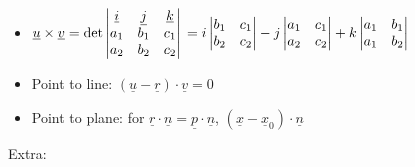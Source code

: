 \documentclass[10pt]{article}
\begin{document}
\begin{multicols}{2}
\begin{itemize}
    \item $\underline{u}\times\underline{v}=\det\begin{vmatrix}\underline{i} &\underline{j} &\underline{k}\\a_{1} &b_{1} &c_{1}\\a_{2} &b_{2} &c_{2}\end{vmatrix}\\=i\begin{vmatrix}b_{1}&c_{1}\\b_{2}&c_{2}\end{vmatrix}-j\begin{vmatrix}a_{1}&c_{1}\\a_{2}&c_{2}\end{vmatrix}+k\begin{vmatrix}a_{1}&b_{1}\\a_{1}&b_{2}\end{vmatrix}$
    \item Point to line: $(\underline{u}-\underline{r})\cdot\underline{v}=0$
    \item Point to plane: for $\underline{r}\cdot\underline{n}=\underline{p}\cdot\underline{n}$, $(\underline{x}-\underline{x}_{0})\cdot\underline{n}$
\end{itemize}
\end{multicols}
Extra:
\newpage
{}
\end{document}
